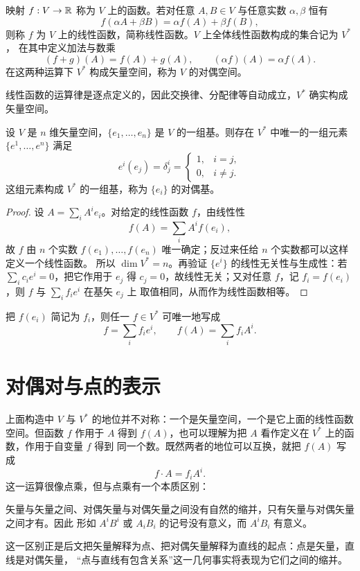 \begin{definition}[线性函数与对偶空间]
映射 $f:V\to\mathbb{R}$ 称为 $V$ 上的函数。若对任意 $A,B\in V$ 与任意实数 $\alpha,\beta$ 恒有
\[
f(\alpha A+\beta B)=\alpha f(A)+\beta f(B),
\]
则称 $f$ 为 $V$ 上的线性函数，简称线性函数。$V$ 上全体线性函数构成的集合记为 $V^*$，
在其中定义加法与数乘
\[
(f+g)(A)=f(A)+g(A),\qquad (\alpha f)(A)=\alpha f(A).
\]
在这两种运算下 $V^*$ 构成矢量空间，称为 $V$ 的对偶空间。
\end{definition}

线性函数的运算律是逐点定义的，因此交换律、分配律等自动成立，$V^*$ 确实构成矢量空间。

\begin{proposition}[对偶基]
设 $V$ 是 $n$ 维矢量空间，$\{e_1,\dots,e_n\}$ 是 $V$ 的一组基。则存在 $V^*$ 中唯一的一组元素
$\{e^1,\dots,e^n\}$ 满足
\[
e^i(e_j)=\delta^i_j=
\begin{cases}
1,& i=j,\\
0,& i\neq j .
\end{cases}
\]
这组元素构成 $V^*$ 的一组基，称为 $\{e_i\}$ 的对偶基。
\end{proposition}

\begin{proof}
设 $A=\sum_i A^i e_i$。对给定的线性函数 $f$，由线性性
\[
f(A)=\sum_i A^i f(e_i),
\]
故 $f$ 由 $n$ 个实数 $f(e_1),\dots,f(e_n)$ 唯一确定；反过来任给 $n$ 个实数都可以这样定义一个线性函数。
所以 $\dim V^*=n$。再验证 $\{e^i\}$ 的线性无关性与生成性：若 $\sum_i c_i e^i=0$，把它作用于 $e_j$
得 $c_j=0$，故线性无关；又对任意 $f$，记 $f_i=f(e_i)$，则 $f$ 与 $\sum_i f_i e^i$ 在基矢 $e_j$ 上
取值相同，从而作为线性函数相等。
\end{proof}

把 $f(e_i)$ 简记为 $f_i$，则任一 $f\in V^*$ 可唯一地写成
\[
f=\sum_i f_i e^i,\qquad f(A)=\sum_i f_iA^i .
\]

\section{对偶对与点的表示}

上面构造中 $V$ 与 $V^*$ 的地位并不对称：一个是矢量空间，一个是它上面的线性函数空间。但函数
$f$ 作用于 $A$ 得到 $f(A)$，也可以理解为把 $A$ 看作定义在 $V^*$ 上的函数，作用于自变量 $f$ 得到
同一个数。既然两者的地位可以互换，就把 $f(A)$ 写成
\[
f\cdot A=f_iA^i .
\]
这一运算很像点乘，但与点乘有一个本质区别：

\begin{remark}
矢量与矢量之间、对偶矢量与对偶矢量之间没有自然的缩并，只有矢量与对偶矢量之间才有。因此
形如 $A^iB^i$ 或 $A_iB_i$ 的记号没有意义，而 $A^iB_i$ 有意义。
\end{remark}

这一区别正是后文把矢量解释为点、把对偶矢量解释为直线的起点：点是矢量，直线是对偶矢量，
“点与直线有包含关系”这一几何事实将表现为它们之间的缩并。
